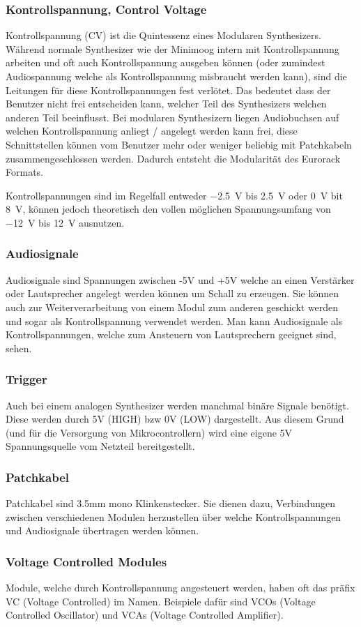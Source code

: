 \subsubsection{Kontrollspannung, Control Voltage}
\label{sec:orge7569ea}
Kontrollspannung (CV) ist die Quintessenz eines Modularen Synthesizers. Während normale Synthesizer wie der Minimoog intern mit Kontrollspannung arbeiten und oft auch Kontrollspannung ausgeben können (oder zumindest Audiospannung welche als Kontrollspannung misbraucht werden kann), sind die Leitungen für diese Kontrollspannungen fest verlötet. Das bedeutet dass der Benutzer nicht frei entscheiden kann, welcher Teil des Synthesizers welchen anderen Teil beeinflusst. Bei modularen Synthesizern liegen Audiobuchsen auf welchen Kontrollspannung anliegt / angelegt werden kann frei, diese Schnittstellen können vom Benutzer mehr oder weniger beliebig mit Patchkabeln zusammengeschlossen werden. Dadurch entsteht die Modularität des Eurorack Formats.

Kontrollspannungen sind im Regelfall entweder \SI{-2.5}{\volt} bis \SI{+2.5}{\volt} oder \SI{0}{\volt} bit \SI{8}{\volt}, können jedoch theoretisch den vollen möglichen Spannungsumfang von \SI{-12}{\volt} bis \SI{+12}{\volt} ausnutzen.

\subsubsection{Audiosignale}
\label{sec:org600b5cb}
Audiosignale sind Spannungen zwischen -5V und +5V welche an einen Verstärker oder Lautsprecher angelegt werden können um Schall zu erzeugen. Sie können auch zur Weiterverarbeitung von einem Modul zum anderen geschickt werden und sogar als Kontrollspannung verwendet werden. Man kann Audiosignale als Kontrollspannungen, welche zum Ansteuern von Lautsprechern geeignet sind, sehen.

\subsubsection{Trigger}
\label{sec:org56bae3a}
Auch bei einem analogen Synthesizer werden manchmal binäre Signale benötigt. Diese werden durch 5V (HIGH) bzw 0V (LOW) dargestellt. Aus diesem Grund (und für die Versorgung von Mikrocontrollern) wird eine eigene 5V Spannungsquelle vom Netzteil bereitgestellt.

\subsubsection{Patchkabel}
\label{sec:org2ca656a}
Patchkabel sind 3.5mm mono Klinkenstecker. Sie dienen dazu, Verbindungen zwischen verschiedenen Modulen herzustellen über welche Kontrollspannungen und Audiosignale übertragen werden können.

\subsubsection{Voltage Controlled Modules}
\label{sec:orgd6b6039}
Module, welche durch Kontrollspannung angesteuert werden, haben oft das präfix VC (Voltage Controlled) im Namen. Beispiele dafür sind VCOs (Voltage Controlled Oscillator) und VCAs (Voltage Controlled Amplifier).
